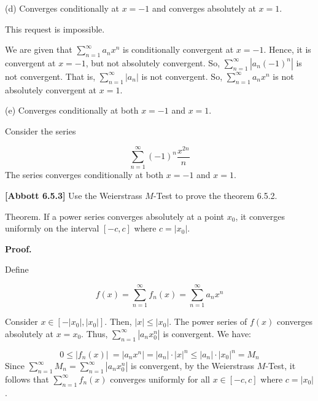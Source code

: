 \documentclass[10pt]{article}
\begin{document}
(d) Converges conditionally at $\displaystyle x=-1$ and converges absolutely at $\displaystyle x=1$. 



This request is impossible.



We are given that $\displaystyle \sum _{n=1}^{\infty } a_{n} x^{n}$ is conditionally convergent at $\displaystyle x=-1$. Hence, it is convergent at $\displaystyle x=-1$, but not absolutely convergent. So, $\displaystyle \sum _{n=1}^{\infty } |a_{n}( -1)^{n} |$ is not convergent. That is, $\displaystyle \sum _{n=1}^{\infty } |a_{n} |$ is not convergent. So, $\displaystyle \sum _{n=1}^{\infty } a_{n} x^{n}$ is not absolutely convergent at $\displaystyle x=1$.



(e) Converges conditionally at both $\displaystyle x=-1$ and $\displaystyle x=1$. 



Consider the series 


\begin{equation*}
\sum _{n=1}^{\infty }( -1)^{n}\frac{x^{2n}}{n}
\end{equation*}
The series converges conditionally at both $\displaystyle x=-1$ and $\displaystyle x=1$.



\textbf{[Abbott 6.5.3]} Use the Weierstrass $\displaystyle M$-Test to prove the theorem 6.5.2.



Theorem. If a power series converges absolutely at a point $\displaystyle x_{0}$, it converges uniformly on the interval $\displaystyle [ -c,c]$ where $\displaystyle c=|x_{0} |$.



\textbf{Proof.}



Define


\begin{equation*}
f( x) =\sum _{n=1}^{\infty } f_{n}( x) =\sum _{n=1}^{\infty } a_{n} x^{n}
\end{equation*}




Consider $\displaystyle x\in [ -|x_{0} |,|x_{0} |]$. Then, $\displaystyle |x|\leq |x_{0} |$. The power series of $\displaystyle f( x)$ converges absolutely at $\displaystyle x=x_{0}$. Thus, $\displaystyle \sum _{n=1}^{\infty } |a_{n} x_{0}^{n} |$ is convergent. We have:


\begin{equation*}
0\leq |f_{n}( x) |\ =|a_{n} x^{n} |=|a_{n} |\cdot |x|^{n} \leq |a_{n} |\cdot |x_{0} |^{n} =M_{n}
\end{equation*}
Since $\displaystyle \sum _{n=1}^{\infty } M_{n} =\sum _{n=1}^{\infty } |a_{n} x_{0}^{n} |$ is convergent, by the Weierstrass $\displaystyle M$-Test, it follows that $\displaystyle \sum _{n=1}^{\infty } f_{n}( x)$ converges uniformly for all $\displaystyle x\in [ -c,c]$ where $\displaystyle c=|x_{0} |$. 
\end{document}
